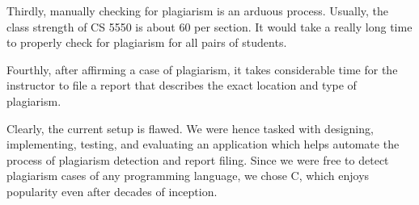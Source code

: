 \documentclass[12pt]{article}
\begin{document}
\par Thirdly, manually checking for plagiarism is an arduous process. Usually, the class strength of CS 5550 is about 60 per section. It would take a really long time to properly check for plagiarism for all pairs of students. 

\par Fourthly, after affirming a case of plagiarism, it takes considerable time for the instructor to file a report that describes the exact location and type of plagiarism.

\par Clearly, the current setup is flawed. We were hence tasked with designing, implementing, testing, and evaluating an application which helps automate the process of plagiarism detection and report filing. Since we were free to detect plagiarism cases of any programming language, we chose C, which enjoys popularity even after decades of inception.
\end{document}
